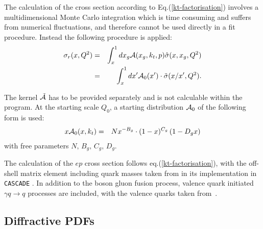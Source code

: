 The calculation of the cross section according to Eq.(\ref{kt-factorisation})
 involves a multidimensional Monte Carlo integration which is time consuming
 and suffers from numerical fluctuations, and therefore cannot be used directly in a fit
 procedure.
Instead the following procedure is applied:
\begin{eqnarray}
\nonumber
\sigma_r(x,Q^2) & = & \int_x^1 d x_g {\cal A}(x_g,\kt,\Pmax) \hat{ \sigma}(x,x_g,Q^2) \\
  & = & \int_x^1 dx' {\cal A}_0 (x') \cdot \tilde{ \sigma}(x/x',Q^2). 
  \label{final-convolution}
\end{eqnarray}

The kernel ${\cal \tilde A}$ has to be provided separately and is not
 calculable within the program. 
At the starting scale $Q_0$, a starting distribution ${\cal A}_0$ of the 
following form is used:  
\begin{eqnarray}
x{\cal A}_0(x,\kt) &=& N x^{-B_g} \cdot (1 -x)^{C_g}\left( 1 -D_g x\right) 
\label{a0}
\end{eqnarray}
with free parameters $N,\, B_g,\, C_g,\, D_g$. 

The calculation of the $ep$ cross section follows eq.(\ref{kt-factorisation}), 
with the off-shell matrix element including quark masses taken from \cite{Catani:1990eg} 
in its implementation in {\tt CASCADE} \cite{Jung:2010si}.
In addition to the boson gluon fusion process, valence quark initiated 
$\gamma q\to q$ processes are included, with the valence quarks taken from~\cite{Deak:2010gk}.


\subsection{Diffractive PDFs}

\newcommand{\asotp}{\ensuremath{\frac{\alpha_{\rm s}}{2\pi}}}
\newcommand{\Sgl}[1]{\ensuremath{\tilde f_{#1+}}}
\newcommand{\Pom}{{I\!P}}
\newcommand{\Reg}{{I\!R}}
\newcommand{\xpom}{$x_{I\!P}$}


